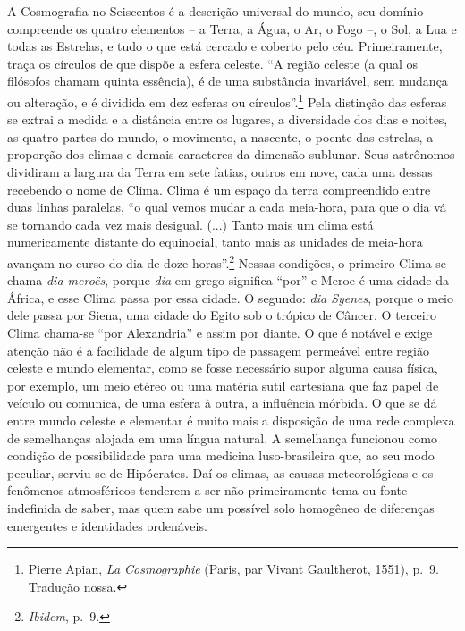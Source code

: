 A Cosmografia no Seiscentos é a descrição universal do mundo, seu
domínio compreende os quatro elementos -- a Terra, a Água, o Ar, o Fogo
--, o Sol, a Lua e todas as Estrelas, e tudo o que está cercado e
coberto pelo céu. Primeiramente, traça os círculos de que dispõe a
esfera celeste. ``A região celeste (a qual os filósofos chamam quinta
essência), é de uma substância invariável, sem mudança ou alteração, e é
dividida em dez esferas ou círculos''.\footnote{Pierre Apian, \emph{La
  Cosmographie} (Paris, par Vivant Gaultherot, 1551), p.~9. Tradução
  nossa.} Pela distinção das esferas se extrai a medida e a distância
entre os lugares, a diversidade dos dias e noites, as quatro partes do
mundo, o movimento, a nascente, o poente das estrelas, a proporção dos
climas e demais caracteres da dimensão sublunar. Seus astrônomos
dividiram a largura da Terra em sete fatias, outros em nove, cada uma
dessas recebendo o nome de Clima. Clima é um espaço da terra
compreendido entre duas linhas paralelas, ``o qual vemos mudar a cada
meia-hora, para que o dia vá se tornando cada vez mais desigual. (...)
Tanto mais um clima está numericamente distante do equinocial, tanto
mais as unidades de meia-hora avançam no curso do dia de doze
horas''.\footnote{\emph{Ibidem}, p.~9.} Nessas condições, o primeiro
Clima se chama \emph{dia meroës}, porque \emph{dia} em grego significa
``por'' e Meroe é uma cidade da África, e esse Clima passa por essa
cidade. O segundo: \emph{dia Syenes}, porque o meio dele passa por
Siena, uma cidade do Egito sob o trópico de Câncer. O terceiro Clima
chama-se ``por Alexandria'' e assim por diante. O que é notável e exige
atenção não é a facilidade de algum tipo de passagem permeável entre
região celeste e mundo elementar, como se fosse necessário supor alguma
causa física, por exemplo, um meio etéreo ou uma matéria sutil
cartesiana que faz papel de veículo ou comunica, de uma esfera à outra,
a influência mórbida. O que se dá entre mundo celeste e elementar é
muito mais a disposição de uma rede complexa de semelhanças alojada em
uma língua natural. A semelhança funcionou como condição de
possibilidade para uma medicina luso-brasileira que, ao seu modo
peculiar, serviu-se de Hipócrates. Daí os climas, as causas
meteorológicas e os fenômenos atmosféricos tenderem a ser não
primeiramente tema ou fonte indefinida de saber, mas quem sabe um
possível solo homogêneo de diferenças emergentes e identidades
ordenáveis.

